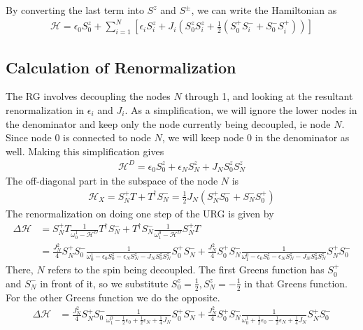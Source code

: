 By converting the last term into \(S^z\) and \(S^\pm\), we can write the Hamiltonian as
\begin{equation}\begin{aligned}
	\mathcal{H} = \epsilon_0 S^z_0 + \sum_{i=1}^N\left[\epsilon_i S^z_i + J_i\left(S^z_0 S^z_i + \frac{1}{2}\left(S_0^+ S^-_i + S_0^- S^+_i\right)\right)\right]
\end{aligned}\end{equation}

\subsection{Calculation of Renormalization}

The RG involves decoupling the nodes \(N\) through 1, and looking at the resultant renormalization in \(\epsilon_i\) and \(J_i\). As a simplification, we will ignore the lower nodes in the denominator and keep only the node currently being decoupled, ie node \(N\). Since node \(0\) is connected to node \(N\), we will keep node \(0\) in the denominator as well. Making this simplification gives
\begin{equation}\begin{aligned}
	\label{stardiag}
\mathcal{H}^D =\epsilon_0 S^z_0 + \epsilon_N S^z_N + J_NS^z_0 S^z_N 
\end{aligned}\end{equation}
The off-diagonal part in the subspace of the node \(N\) is
\begin{equation}\begin{aligned}
\mathcal{H}_X = S_N^+ T + T^\dagger S_N^- = \frac{1}{2}J_N \left(S_N^+ S_0^- + S_N^- S_0^+\right)
\end{aligned}\end{equation}
The renormalization on doing one step of the URG is given by
\begin{equation}\begin{aligned}
	\Delta \mathcal{H} &=  S_N^+ T \frac{1}{\omega_0^1 - \mathcal{H}^D}T^\dagger  S_N^- + T^\dagger  S_N^- \frac{1}{\omega_1^0 - \mathcal{H}^D} S_N^+ T\\
			   &= \frac{J_N^2}{4}S_N^+ S_0^- \frac{1}{\omega_0^1 - \epsilon_0 S^z_0 - \epsilon_N S^z_N - J_NS^z_0 S^z_N}S_0^+  S_N^- + \frac{J_N^2}{4}S_0^+  S_N^- \frac{1}{\omega_1^0 - \epsilon_0 S^z_0 - \epsilon_N S^z_N - J_NS^z_0 S^z_N} S_N^+ S_0^-
\end{aligned}\end{equation}
There, \(N\) refers to the spin being decoupled. The first Greens function has \(S_0^+\) and \(S_N^-\) in front of it, so we substitute \(S_0^z = \frac{1}{2}, S_N^z = -\frac{1}{2}\) in that Greens function. For the other Greens function we do the opposite.
\begin{equation}\begin{aligned}
	\Delta \mathcal{H} &= \frac{J_N^2}{4}S_N^+ S_0^- \frac{1}{\omega_1^0 - \frac{1}{2}\epsilon_0  + \frac{1}{2}\epsilon_N + \frac{1}{4}J_N}S_0^+  S_N^- + \frac{J_N^2}{4}S_0^+  S_N^- \frac{1}{\omega_0^1 + \frac{1}{2}\epsilon_0 - \frac{1}{2}\epsilon_N + \frac{1}{4}J_N} S_N^+ S_0^-
\end{aligned}\end{equation}

